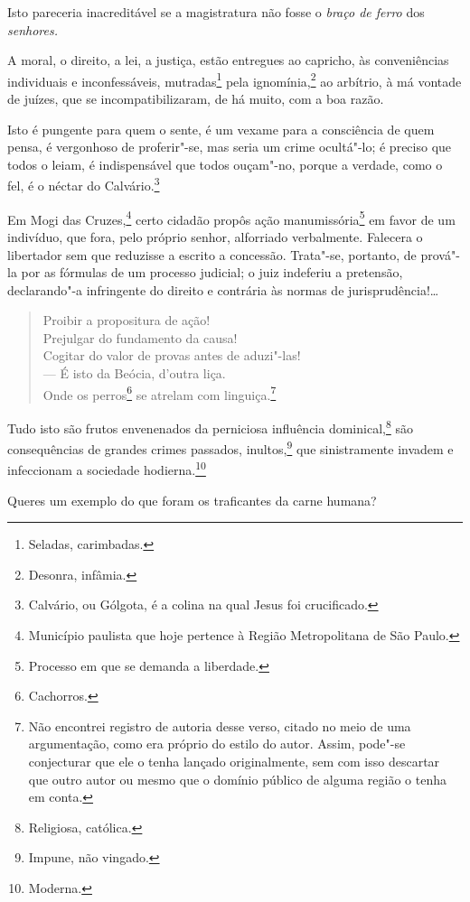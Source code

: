 Isto pareceria inacreditável se a magistratura não fosse o \emph{braço
de ferro} dos \emph{senhores.}

A moral, o direito, a lei, a justiça, estão entregues ao capricho, às
conveniências individuais e inconfessáveis, mutradas\footnote{Seladas,
  carimbadas.} pela ignomínia,\footnote{Desonra, infâmia.} ao
arbítrio, à má vontade de juízes, que se incompatibilizaram, de há
muito, com a boa razão.

Isto é pungente para quem o sente, é um vexame para a consciência de
quem pensa, é vergonhoso de proferir"-se, mas seria um crime ocultá"-lo; é
preciso que todos o leiam, é indispensável que todos ouçam"-no, porque a
verdade, como o fel, é o néctar do Calvário.\footnote{Calvário, ou
  Gólgota, é a colina na qual Jesus foi crucificado.}

Em Mogi das Cruzes,\footnote{Município paulista que hoje pertence à
  Região Metropolitana de São Paulo.} certo cidadão propôs ação
manumissória\footnote{Processo em que se demanda a liberdade.} em
favor de um indivíduo, que fora, pelo próprio senhor, alforriado
verbalmente. Falecera o libertador sem que reduzisse a escrito a
concessão. Trata"-se, portanto, de prová"-la por as fórmulas de um
processo judicial; o juiz indeferiu a pretensão, declarando"-a
infringente do direito e contrária às normas de jurisprudência!\ldots{}

\begin{verse}
Proibir a propositura de ação!\\
Prejulgar do fundamento da causa!\\
Cogitar do valor de provas antes de aduzi"-las!\\
--- É isto da Beócia, d'outra liça.\\
Onde os perros\footnote{Cachorros.} se atrelam com linguiça.\footnote{
  Não encontrei registro de autoria desse verso, citado no meio de uma
  argumentação, como era próprio do estilo do autor. Assim, pode"-se
  conjecturar que ele o tenha lançado originalmente, sem com isso
  descartar que outro autor ou mesmo que o domínio público de alguma
  região o tenha em conta.}
\end{verse}  

Tudo isto são frutos envenenados da perniciosa influência
dominical,\footnote{Religiosa, católica.} são consequências de grandes
crimes passados, inultos,\footnote{Impune, não vingado.} que
sinistramente invadem e infeccionam a sociedade hodierna.\footnote{
  Moderna.}

Queres um exemplo do que foram os traficantes da carne humana?

